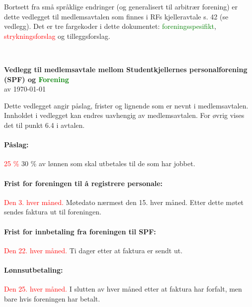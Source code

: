 \documentclass[12pt]{article}
\begin{document}
\pagestyle{fancy}
\fancyhf{}

\begin{itshape}
Bortsett fra små språklige endringer (og generalisert til
arbitrær forening) er dette vedlegget til
medlemsavtalen som finnes i RFs kjelleravtale s. 42 (se vedlegg).
Det er tre fargekoder i dette dokumentet: 
\textcolor{green}{foreningsspesifikt}, 
\textcolor{red}{strykningsforslag}
og \textcolor{Cerulean}{tilleggsforslag}.
\end{itshape}
\\[24pt]
\begin{center}
    {\LARGE\textbf{Vedlegg til 
    medlemsavtale mellom Studentkjellernes 
    personalforening (SPF) og \textcolor{green}
    {Forening}}}\\[7pt]
    av \today\\[24pt]
\end{center}

Dette vedlegget angir påslag, frister
og lignende som er nevnt i medlemsavtalen.
Innholdet i vedlegget kan endres
uavhengig av medlemsavtalen.
For øvrig vises det til punkt
6.4 i avtalen.
\paragraph{Påslag:}
\label{par:1}
\textcolor{red}{25 \%} \textcolor{Cerulean}{30 \%} av lønnen som skal utbetales
til de som har jobbet.
\paragraph{Frist for foreningen
til å registrere personale:}
\label{par:2}
\textcolor{red}{Den 3. hver måned.}
\textcolor{Cerulean}
{Møtedato nærmest den 15. hver måned. Etter dette møtet 
sendes faktura ut til foreningen.}
\paragraph{Frist for innbetaling
fra foreningen til SPF:}
\label{par:3}
\textcolor{red}{Den 22. hver måned.}
\textcolor{Cerulean}{Ti dager etter
at faktura er sendt ut.}
\paragraph{Lønnsutbetaling:}
\label{par:4}
\textcolor{red}{Den 25. hver måned.}
\textcolor{Cerulean}{I slutten
av hver måned etter at faktura
har forfalt, men bare hvis foreningen
har betalt.}
\end{document}
